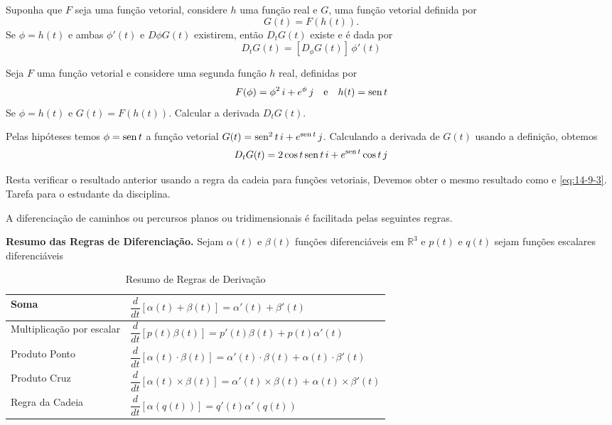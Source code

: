 \begin{teo}\label{thm:14-4-9}
Suponha que \(F\) seja uma função vetorial, considere \(h\) uma função real e \(G\), uma função vetorial definida por
\begin{equation*}
  G(t) = F(h(t)).
\end{equation*}
 Se \(\phi = h(t)\) e ambas \( \phi'(t)\) e \(D{\phi}G(t)\) existirem, então \(D_{t}G(t)\) existe e é dada por
 \begin{equation*}
   D_{t}G(t)= [D_{\phi}G(t)]\, \phi'(t)
 \end{equation*}
\end{teo}

\begin{exc}
Seja  \(F\) uma função vetorial e considere uma segunda função \(h\) real, definidas por
\begin{equation*}
  F(\phi)=\phi^{2}\, i + e^{\phi}\, j\quad \text{e}\quad h(t) = \operatorname{sen} t
\end{equation*}
Se \(\phi =h(t)\) e \(G(t)=F(h(t))\). Calcular a derivada \( D_{t}G(t)\).
\end{exc}

\solo
Pelas hipóteses temos \( \phi =\operatorname{sen} t\) a função vetorial \( G(t)=\operatorname{sen}^{2} t\, i + e^{\operatorname{sen} t}\, j\). Calculando a derivada de \( G(t)\) usando a definição, obtemos
\begin{equation}\label{eq:14-9-3}
  D_{t}G(t)=2 \cos t \operatorname{sen} t\, i + e^{\operatorname{sen} t}\cos t\, j
\end{equation}

Resta verificar o resultado anterior usando a regra da cadeia para funções vetoriais, Devemos obter o mesmo resultado como e \eqref{eq:14-9-3}. Tarefa para o estudante da disciplina.

\bigskip
A diferenciação de caminhos ou percursos planos ou tridimensionais é facilitada pelas seguintes regras.

%
\noindent\textbf{Resumo das Regras de Diferenciação.}
%
Sejam $\alpha(t)$ e $\beta(t)$ funções diferenciáveis em $\mathbb{R}^{3}$ e $p(t)$ e $q(t)$ sejam funções escalares diferenciáveis
\begin{table}[!h]
  \centering
\begin{tabularx}{\textwidth} { >{\raggedright\arraybackslash}X | >{\raggedright\arraybackslash} X }
 \hline
Soma &   \(\dfrac{d}{dt}\left[\alpha(t)+\beta(t) \right]=\alpha'(t)+\beta'(t)\) \\[2ex]
 \hline
Multiplicação por escalar &   \(\dfrac{d}{dt}\left[p(t)\beta(t) \right]=p'(t)\beta(t)+p(t)\alpha'(t)\)\\[2ex]
\hline
Produto Ponto & \(\dfrac{d}{dt}\left[\alpha(t)\cdot \beta(t) \right]=\alpha'(t)\cdot \beta(t)+\alpha(t)\cdot \beta'(t) \)\\[2ex]
\hline
Produto Cruz & \(\dfrac{d}{dt}\left[\alpha(t)\times \beta(t) \right]=\alpha'(t)\times \beta(t)+\alpha(t)\times \beta'(t) \)\\[2ex]
\hline
Regra da Cadeia &  \(\dfrac{d}{dt}\left[\alpha\left(q(t)\right)\right]=q'(t)\alpha'(q(t))\)\\[2ex]
\hline
\end{tabularx}
\caption{Resumo de Regras de Derivação}
\label{tab:1-1}
\end{table}

